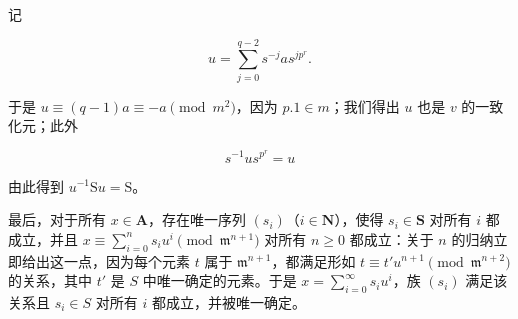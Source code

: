 记

\[
u = \sum_ {j = 0} ^ {q - 2} s ^ {- j} a s ^ {j p ^ {r}}.
\]

于是 \(u \equiv (q - 1)a \equiv -a \pmod{m^2}\)，因为 \(p.1 \in m\)；我们得出 \(u\) 也是 \(v\) 的一致化元；此外

\[
s ^ {- 1} u s ^ {p ^ {r}} = u\tag{3}
\]

由此得到 \(u^{-1} \mathrm{S}u = \mathrm{S}\)。

最后，对于所有 \(x \in \mathbf{A}\)，存在唯一序列 \((s_i)\)（\(i \in \mathbf{N}\)），使得 \(s_i \in \mathbf{S}\) 对所有 \(i\) 都成立，并且 \(x \equiv \sum_{i=0}^{n} s_i u^i \pmod{\mathfrak{m}^{n+1}}\) 对所有 \(n \geqslant 0\) 都成立：关于 \(n\) 的归纳立即给出这一点，因为每个元素 \(t\) 属于 \(\mathfrak{m}^{n+1}\)，都满足形如 \(t \equiv t'u^{n+1} \pmod{\mathfrak{m}^{n+2}}\) 的关系，其中 \(t'\) 是 \(S\) 中唯一确定的元素。于是 \(x = \sum_{i=0}^{\infty} s_i u^i\)，族 \((s_i)\) 满足该关系且 \(s_i \in S\) 对所有 \(i\) 都成立，并被唯一确定。

